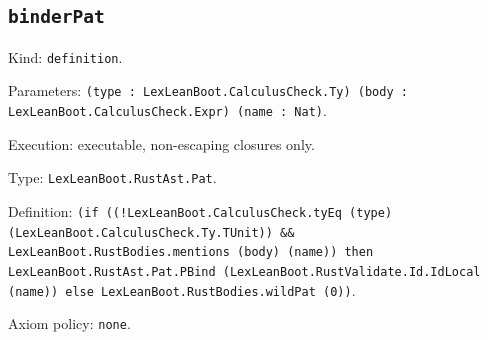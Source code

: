 \documentclass[11pt]{article}
\begin{document}
\subsection*{\texttt{binderPat}}
\noindent Kind: \texttt{definition}.\par
\noindent Parameters: \texttt{(type : LexLeanBoot.CalculusCheck.Ty) (body : LexLeanBoot.CalculusCheck.Expr) (name : Nat)}.\par
\noindent Execution: executable, non-escaping closures only.\par
\noindent Type: \texttt{LexLeanBoot.RustAst.Pat}.\par
\noindent Definition: \texttt{(if ((!LexLeanBoot.CalculusCheck.tyEq (type) (LexLeanBoot.CalculusCheck.Ty.TUnit)) \&\& LexLeanBoot.RustBodies.mentions (body) (name)) then LexLeanBoot.RustAst.Pat.PBind (LexLeanBoot.RustValidate.Id.IdLocal (name)) else LexLeanBoot.RustBodies.wildPat (0))}.\par
\noindent Axiom policy: \texttt{none}.\par
\end{document}
